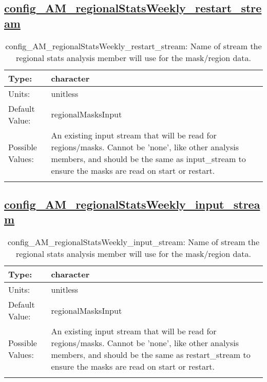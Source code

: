 \subsection[config\_AM\_regionalStatsWeekly\_restart\_stream]{\hyperref[sec:nm_tab_AM_regionalStatsWeekly]{config\_AM\_regionalStatsWeekly\_restart\_stream}}
\label{subsec:nm_sec_config_AM_regionalStatsWeekly_restart_stream}
\begin{center}
\begin{longtable}{| p{2.0in} || p{4.0in} |}
    \hline
    Type: & character \\
    \hline
    Units: & \si{unitless} \\
    \hline
    Default Value: & regionalMasksInput \\
    \hline
    Possible Values: & An existing input stream that will be read for regions/masks. Cannot be 'none', like other analysis members, and should be the same as input\_stream to ensure the masks are read on start or restart. \\
    \hline
    \caption{config\_AM\_regionalStatsWeekly\_restart\_stream: Name of stream the regional stats analysis member will use for the mask/region data.}
\end{longtable}
\end{center}
\subsection[config\_AM\_regionalStatsWeekly\_input\_stream]{\hyperref[sec:nm_tab_AM_regionalStatsWeekly]{config\_AM\_regionalStatsWeekly\_input\_stream}}
\label{subsec:nm_sec_config_AM_regionalStatsWeekly_input_stream}
\begin{center}
\begin{longtable}{| p{2.0in} || p{4.0in} |}
    \hline
    Type: & character \\
    \hline
    Units: & \si{unitless} \\
    \hline
    Default Value: & regionalMasksInput \\
    \hline
    Possible Values: & An existing input stream that will be read for regions/masks. Cannot be 'none', like other analysis members, and should be the same as restart\_stream to ensure the masks are read on start or restart. \\
    \hline
    \caption{config\_AM\_regionalStatsWeekly\_input\_stream: Name of stream the regional stats analysis member will use for the mask/region data.}
\end{longtable}
\end{center}
